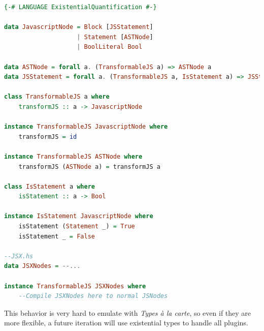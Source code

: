 \begin{lstlisting}[linewidth=\columnwidth, caption={Existential types preserving hierarchy}, captionpos=b, label=lst:is_statement, language=Haskell, breaklines=true]
{-# LANGUAGE ExistentialQuantification #-}

data JavascriptNode = Block [JSStatement]
                    | Statement [ASTNode]
                    | BoolLiteral Bool

data ASTNode = forall a. (TransformableJS a) => ASTNode a
data JSStatement = forall a. (TransformableJS a, IsStatement a) => JSStatement a

class TransformableJS a where
    transformJS :: a -> JavascriptNode

instance TransformableJS JavascriptNode where
    transformJS = id

instance TransformableJS ASTNode where
    transformJS (ASTNode a) = transformJS a

class IsStatement a where
    isStatement :: a -> Bool

instance IsStatement JavascriptNode where
    isStatement (Statement _) = True
    isStatement _ = False

--JSX.hs
data JSXNodes = --...

instance TransformableJS JSXNodes where
    --Compile JSXNodes here to normal JSNodes

\end{lstlisting}

This behavior is very hard to emulate with \textit{Types \`a la carte}, so even if they are more flexible, a future iteration will use existential types to handle all plugins.
